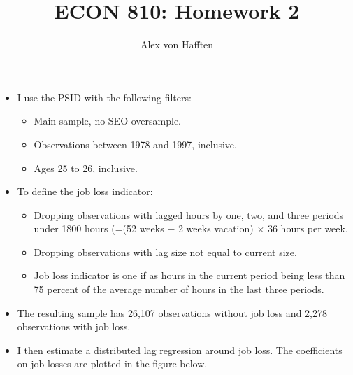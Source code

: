 \documentclass{article}
\title{ECON 810: Homework 2}
\author{Alex von Hafften }
\begin{document}
\maketitle

\begin{itemize}

\section{Part 1: Data}

\item I use the PSID with the following filters:

\begin{itemize}
\item Main sample, no SEO oversample.
\item Observations between 1978 and 1997, inclusive.
\item Ages 25 to 26, inclusive.
\end{itemize}

\item To define the job loss indicator:

\begin{itemize}
\item Dropping observations with lagged hours by one, two, and three periods under 1800 hours (=(52 weeks $-$ 2 weeks vacation) $\times$ 36 hours per week.
\item Dropping observations with lag size not equal to current size.
\item Job loss indicator is one if as hours in the current period being less than 75 percent of the average number of hours in the last three periods.
\end{itemize}

\item The resulting sample has 26,107 observations without job loss and 2,278 observations with job loss.

\item I then estimate a distributed lag regression around job loss.  The coefficients on job losses are plotted in the figure below.


\end{itemize}
\end{document}

